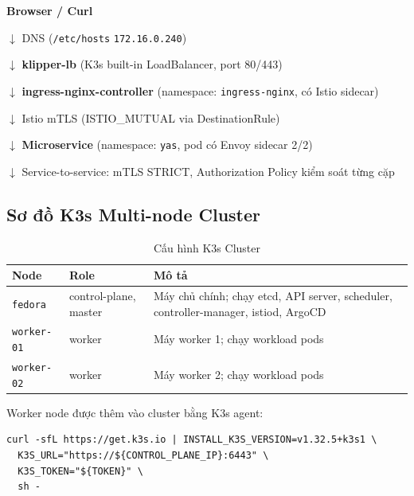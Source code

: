 \begin{tcolorbox}[colback=blue!3, colframe=codeblue!70, title=Luồng traffic qua K3s cluster]
  \footnotesize
  \textbf{Browser / Curl} \par
  $\downarrow$ DNS (\texttt{/etc/hosts} \textrightarrow{} \texttt{172.16.0.240}) \par
  $\downarrow$ \textbf{klipper-lb} (K3s built-in LoadBalancer, port 80/443) \par
  $\downarrow$ \textbf{ingress-nginx-controller} (namespace: \texttt{ingress-nginx}, có Istio sidecar) \par
  $\downarrow$ Istio mTLS (ISTIO\_MUTUAL via DestinationRule) \par
  $\downarrow$ \textbf{Microservice} (namespace: \texttt{yas}, pod có Envoy sidecar 2/2) \par
  $\downarrow$ Service-to-service: mTLS STRICT, Authorization Policy kiểm soát từng cặp
\end{tcolorbox}

\subsection{Sơ đồ K3s Multi-node Cluster}

\begin{table}[H]
  \centering
  \caption{Cấu hình K3s Cluster}
  \begin{tabularx}{\textwidth}{L{3cm}L{3cm}X}
    \toprule
    \textbf{Node} & \textbf{Role} & \textbf{Mô tả} \\
    \midrule
    \texttt{fedora} & control-plane, master & Máy chủ chính; chạy etcd, API server, scheduler,
                                              controller-manager, istiod, ArgoCD \\
    \texttt{worker-01} & worker & Máy worker 1; chạy workload pods \\
    \texttt{worker-02} & worker & Máy worker 2; chạy workload pods \\
    \bottomrule
  \end{tabularx}
\end{table}

\noindent Worker node được thêm vào cluster bằng K3s agent:
\begin{lstlisting}[style=bashstyle, caption=Cài K3s agent trên worker node]
curl -sfL https://get.k3s.io | INSTALL_K3S_VERSION=v1.32.5+k3s1 \
  K3S_URL="https://${CONTROL_PLANE_IP}:6443" \
  K3S_TOKEN="${TOKEN}" \
  sh -
\end{lstlisting}

